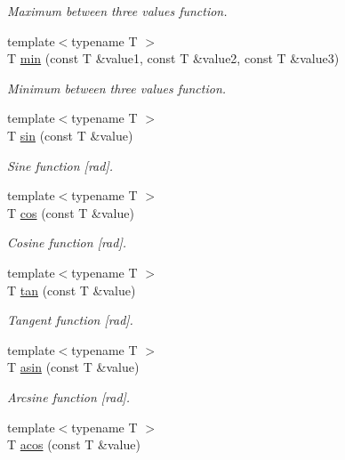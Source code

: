 \begin{DoxyCompactItemize}
\begin{DoxyCompactList}\small\item\em Maximum between three values function. \end{DoxyCompactList}\item 
{\footnotesize template$<$typename T $>$ }\\T \hyperlink{namespaceacme_a49c47fe19dcb5a41cdb8111446c6f51e}{min} (const T \&value1, const T \&value2, const T \&value3)
\begin{DoxyCompactList}\small\item\em Minimum between three values function. \end{DoxyCompactList}\item 
{\footnotesize template$<$typename T $>$ }\\T \hyperlink{namespaceacme_a47c0b8f84e101492adfb8567e85214d9}{sin} (const T \&value)
\begin{DoxyCompactList}\small\item\em Sine function \mbox{[}rad\mbox{]}. \end{DoxyCompactList}\item 
{\footnotesize template$<$typename T $>$ }\\T \hyperlink{namespaceacme_ae74481d6a235be6f194a86ade7719e5c}{cos} (const T \&value)
\begin{DoxyCompactList}\small\item\em Cosine function \mbox{[}rad\mbox{]}. \end{DoxyCompactList}\item 
{\footnotesize template$<$typename T $>$ }\\T \hyperlink{namespaceacme_a0fa0c6c9aef80a18fe865938fa2cb01d}{tan} (const T \&value)
\begin{DoxyCompactList}\small\item\em Tangent function \mbox{[}rad\mbox{]}. \end{DoxyCompactList}\item 
{\footnotesize template$<$typename T $>$ }\\T \hyperlink{namespaceacme_a8c712ed5d1336fab688be5cd7c6afd07}{asin} (const T \&value)
\begin{DoxyCompactList}\small\item\em Arcsine function \mbox{[}rad\mbox{]}. \end{DoxyCompactList}\item 
{\footnotesize template$<$typename T $>$ }\\T \hyperlink{namespaceacme_a9ea04b104383cbb01ba4b6bc8fbd1823}{acos} (const T \&value)

\end{DoxyCompactItemize}

